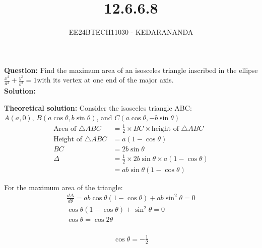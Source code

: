\documentclass[journal]{IEEEtran}
\begin{document}
	
	
	\vspace{3cm}
	
	\title{12.6.6.8}
	\author{EE24BTECH11030 - KEDARANANDA}
	{\let\newpage\relax\maketitle}
	
	\renewcommand{\thefigure}{\theenumi}
	\renewcommand{\thetable}{\theenumi}
	\setlength{\intextsep}{10pt} %
	\textbf{Question:}
	Find the maximum area of an isosceles triangle inscribed in the ellipse $\frac{x^2}{a^2}+\frac{y^2}{b^2}=1$with its vertex at one end of the major axis.\\
	\textbf{Solution:}
	
	\textbf{Theoretical solution:}
	Consider the isosceles triangle ABC: \\
	$A(a, 0)$, $B(a \cos\theta, b \sin\theta)$, and $C(a \cos\theta, -b \sin\theta)$ \\
	
	\begin{align}
		\text{Area of } \triangle ABC &= \frac{1}{2} \times BC \times \text{height of } \triangle ABC \\
		\text{Height of } \triangle ABC &= a(1 - \cos\theta) \\
		BC &= 2b \sin\theta \\
		\Delta &= \frac{1}{2} \times 2b \sin\theta \times a(1 - \cos\theta) \\
		&= ab \sin\theta (1 - \cos\theta)
	\end{align}
	
	For the maximum area of the triangle:
	\begin{align}
		\frac{d\Delta}{d\theta} = ab \cos\theta (1 - \cos\theta) + ab \sin^2\theta = 0 \\
		\cos\theta (1 - \cos\theta) + \sin^2\theta = 0 \\
		\cos\theta=\cos{2\theta}\\
	\end{align}
	
	\begin{align}
		\cos\theta = -\frac{1}{2} \\
	\end{align}
	
\end{document}
